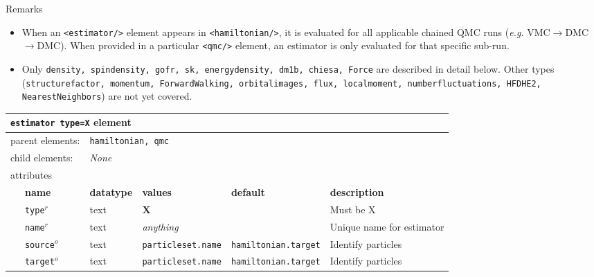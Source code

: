 Remarks
\begin{itemize}
  \item{When an \texttt{<estimator/>} element appears in \texttt{<hamiltonian/>}, it is evaluated for all applicable chained QMC runs (\emph{e.g.} VMC$\rightarrow$DMC$\rightarrow$DMC).  When provided in a particular \texttt{<qmc/>} element, an estimator is only evaluated for that specific sub-run.}
  \item{Only \texttt{density, spindensity, gofr, sk, energydensity, dm1b, chiesa, Force} are described in detail below.  Other types (\texttt{structurefactor, momentum, ForwardWalking, orbitalimages, flux, localmoment, numberfluctuations, HFDHE2, NearestNeighbors}) are not yet covered.}
\end{itemize}





\FloatBarrier
\begin{table}[h]
\begin{center}
\begin{tabularx}{\textwidth}{l l l l l l }
\hline
\multicolumn{6}{l}{\texttt{estimator type=X} element} \\
\hline
\multicolumn{2}{l}{parent elements:} & \multicolumn{4}{l}{\texttt{hamiltonian, qmc}}\\
\multicolumn{2}{l}{child  elements:} & \multicolumn{4}{l}{\textit{None}}\\
\multicolumn{2}{l}{attributes}  & \multicolumn{4}{l}{}\\
   &   \bfseries name     & \bfseries datatype & \bfseries values & \bfseries default   & \bfseries description \\
   & \texttt{type}$^r$    &  text              & \textbf{X}     &                     & Must be X         \\
   & \texttt{name}$^r$    &  text              & \textit{anything}&                  & Unique name for estimator \\
   & \texttt{source}$^o$  &  text              & \texttt{particleset.name} &\texttt{hamiltonian.target}& Identify particles\\
   & \texttt{target}$^o$  &  text              & \texttt{particleset.name} &\texttt{hamiltonian.target}& Identify particles  \\
  \hline
\end{tabularx}
\end{center}
\end{table}
\FloatBarrier


